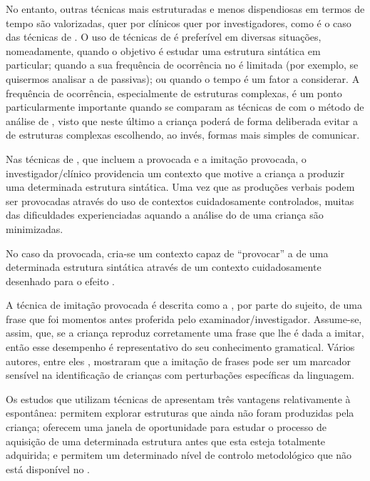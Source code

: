 \documentclass[output=paper]{LSP/langsci}
\begin{document}
No entanto, outras técnicas mais estruturadas e menos dispendiosas em termos de tempo são valorizadas, quer por clínicos quer por investigadores, como é o caso das técnicas de . O uso de técnicas de  é preferível em diversas situações, nomeadamente, quando o objetivo é estudar uma estrutura sintática em particular; quando a sua frequência de ocorrência no  é limitada (por exemplo, se quisermos analisar a  de passivas); ou quando o tempo é um fator a considerar. A frequência de ocorrência, especialmente de estruturas complexas, é um ponto particularmente importante quando se comparam as técnicas de  com o método de análise de , visto que neste último a criança poderá de forma deliberada  evitar a  de estruturas complexas escolhendo, ao invés, formas mais simples de comunicar.

Nas técnicas de , que incluem a  provocada e a imitação provocada, o investigador/clínico providencia um contexto que motive a criança a produzir uma determinada estrutura sintática. Uma vez que as produções verbais podem ser provocadas através do uso de contextos cuidadosamente controlados, muitas das dificuldades experienciadas aquando a análise do  de uma criança são minimizadas. 

No caso da  provocada, cria-se um contexto capaz de ``provocar'' a  de uma determinada estrutura sintática através de um contexto cuidadosamente desenhado para o efeito \citep{thornton1998}.

A técnica de imitação provocada é descrita como a , por parte do sujeito, de uma frase que foi momentos antes proferida pelo examinador/investigador. Assume-se, assim, que, se a criança reproduz corretamente uma frase que lhe é dada a imitar, então esse desempenho é representativo do seu conhecimento gramatical. Vários autores, entre eles \cite{contiramsden_etal2001}, mostraram que a imitação de frases pode ser um marcador sensível na identificação de crianças com perturbações específicas da linguagem. 

Os estudos que utilizam técnicas de  apresentam três vantagens relativamente à  espontânea: permitem explorar estruturas que ainda não foram produzidas pela criança; oferecem uma janela de oportunidade para estudar o processo de aquisição de uma determinada estrutura antes que esta esteja totalmente adquirida; e permitem um determinado nível de controlo metodológico que não está disponível no  \citep{hirshpasekgolinkoff1996}.
\end{document}
